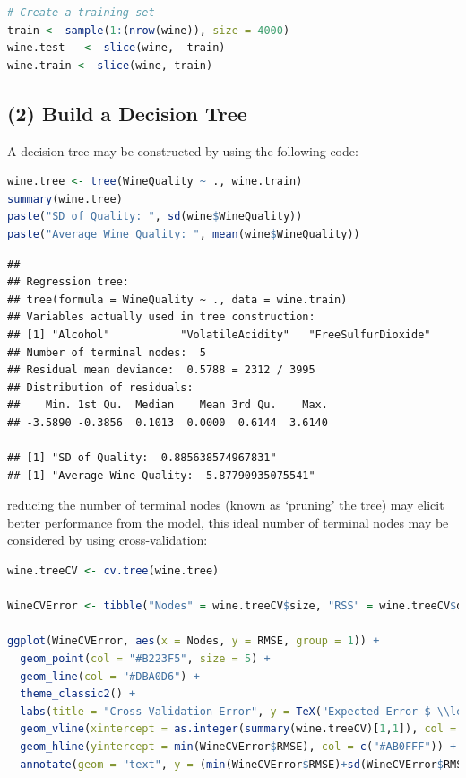 \documentclass[
]{article}
\begin{document}
\begin{lstlisting}[language=R]
# Create a training set
train <- sample(1:(nrow(wine)), size = 4000)
wine.test   <- slice(wine, -train)
wine.train <- slice(wine, train)
\end{lstlisting}

\hypertarget{build-a-decision-tree}{%
\subsection{(2) Build a Decision Tree}\label{build-a-decision-tree}}

A decision tree may be constructed by using the following code:

\begin{lstlisting}[language=R]
wine.tree <- tree(WineQuality ~ ., wine.train)
summary(wine.tree)
paste("SD of Quality: ", sd(wine$WineQuality))
paste("Average Wine Quality: ", mean(wine$WineQuality))
\end{lstlisting}

\begin{lstlisting}
## 
## Regression tree:
## tree(formula = WineQuality ~ ., data = wine.train)
## Variables actually used in tree construction:
## [1] "Alcohol"           "VolatileAcidity"   "FreeSulfurDioxide"
## Number of terminal nodes:  5 
## Residual mean deviance:  0.5788 = 2312 / 3995 
## Distribution of residuals:
##    Min. 1st Qu.  Median    Mean 3rd Qu.    Max. 
## -3.5890 -0.3856  0.1013  0.0000  0.6144  3.6140

## [1] "SD of Quality:  0.885638574967831"
## [1] "Average Wine Quality:  5.87790935075541"
\end{lstlisting}



reducing the number of terminal nodes (known as `pruning' the tree) may
elicit better performance from the model, this ideal number of terminal
nodes may be considered by using cross-validation:

\begin{lstlisting}[language=R]
wine.treeCV <- cv.tree(wine.tree)

WineCVError <- tibble("Nodes" = wine.treeCV$size, "RSS" = wine.treeCV$dev, "MSE" = (wine.treeCV$dev)/length(train), "RMSE" = sqrt((wine.treeCV$dev)/length(train)))

ggplot(WineCVError, aes(x = Nodes, y = RMSE, group = 1)) +
  geom_point(col = "#B223F5", size = 5) +
  geom_line(col = "#DBA0D6") +
  theme_classic2() +
  labs(title = "Cross-Validation Error", y = TeX("Expected Error $ \\left(E ( \\epsilon) \\right)$"), caption = "RMSE is an estimation of the mean residual value, hence it is expressed that RMSE is the expected model error") +
  geom_vline(xintercept = as.integer(summary(wine.treeCV)[1,1]), col = c("#AB0FFF")) +
  geom_hline(yintercept = min(WineCVError$RMSE), col = c("#AB0FFF")) +
  annotate(geom = "text", y = (min(WineCVError$RMSE)+sd(WineCVError$RMSE)), x = (4), label = paste("Expected Error: ", signif(min(WineCVError$RMSE), 3))) 
\end{lstlisting}
\end{document}
